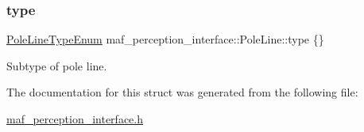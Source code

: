 \subsubsection{\texorpdfstring{type}{type}}
{\footnotesize\ttfamily \hyperlink{structmaf__perception__interface_1_1PoleLineTypeEnum}{Pole\+Line\+Type\+Enum} maf\+\_\+perception\+\_\+interface\+::\+Pole\+Line\+::type \{\}}



Subtype of pole line. 



The documentation for this struct was generated from the following file\+:\begin{DoxyCompactItemize}
\item 
\hyperlink{maf__perception__interface_8h}{maf\+\_\+perception\+\_\+interface.\+h}\end{DoxyCompactItemize}
